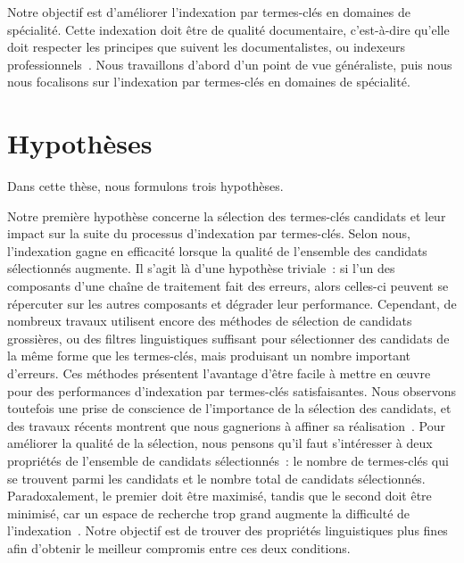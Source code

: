     Notre objectif est d'améliorer l'indexation par termes-clés en domaines de
    spécialité. Cette indexation doit être de qualité documentaire, c'est-à-dire
    qu'elle doit respecter les principes que suivent les documentalistes, ou
    indexeurs professionnels~\cite{guinchat1996techniquesdocumentaires}. Nous
    travaillons d'abord d'un point de vue généraliste, puis nous nous focalisons
    sur l'indexation par termes-clés en domaines de spécialité.


  \section{Hypothèses}
  \label{sec:main-introduction-hypothesis}
    Dans cette thèse, nous formulons trois hypothèses.

    Notre première hypothèse concerne la sélection des termes-clés candidats et
    leur impact sur la suite du processus d'indexation par termes-clés. Selon
    nous, l'indexation gagne en efficacité lorsque la qualité de l'ensemble des
    candidats sélectionnés augmente.
    Il s'agit là d'une hypothèse triviale~: si l'un des composants d'une chaîne
    de traitement fait des erreurs, alors celles-ci peuvent se répercuter sur
    les autres composants et dégrader leur performance. Cependant, de nombreux
    travaux utilisent encore des méthodes de sélection de candidats grossières,
    ou des filtres linguistiques suffisant pour sélectionner des candidats
    de la même forme que les termes-clés, mais produisant un nombre important 
    d'erreurs. Ces méthodes présentent l'avantage d'être facile à mettre en
    \oe{}uvre pour des performances d'indexation par termes-clés satisfaisantes.
    Nous observons toutefois une prise de conscience de l'importance de la
    sélection des candidats, et des travaux récents montrent que nous gagnerions
    à affiner sa réalisation~\cite{wang2014keyphraseextractionpreprocessing}.
    Pour améliorer la qualité de la sélection, nous pensons qu'il faut
    s'intéresser à deux propriétés de l'ensemble de candidats sélectionnés~: le
    nombre de termes-clés qui se trouvent parmi les candidats et le nombre total
    de candidats sélectionnés. Paradoxalement, le premier doit être maximisé,
    tandis que le second doit être minimisé, car un espace de recherche trop
    grand augmente la difficulté de
    l'indexation~\cite{hasan2014state_of_the_art}.
    Notre objectif est de trouver des propriétés linguistiques plus fines
    afin d'obtenir le meilleur compromis entre ces deux conditions.
    
